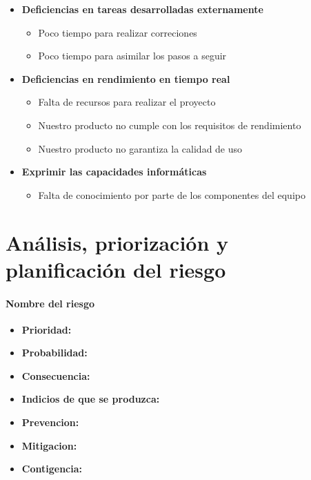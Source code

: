 \documentclass[spanish,a4paper,12pt]{report}	%
\begin{document}
\begin{itemize}
\begin{itemize}
	\end{itemize}
\item \textbf {Deficiencias en tareas desarrolladas externamente}
	\begin{itemize}
		\item {Poco tiempo para realizar correciones}
		\item {Poco tiempo para asimilar los pasos a seguir}
	\end{itemize}
\item \textbf {Deficiencias en rendimiento en tiempo real}
	\begin{itemize}
		\item {Falta de recursos para realizar el proyecto}
		\item {Nuestro producto no cumple con los requisitos de rendimiento}
		\item {Nuestro producto no garantiza la calidad de uso}
	\end{itemize}
\item \textbf {Exprimir las capacidades informáticas}
	\begin{itemize}
		\item {Falta de conocimiento por parte de los componentes del equipo}
	\end{itemize}
\end{itemize}

\newpage
\newpage

\part{Análisis, priorización y planificación del riesgo}
\subsection*{Nombre del riesgo}			%
	\begin{itemize}
		\item \textbf {Prioridad:}
		\item \textbf {Probabilidad:}
		\item \textbf {Consecuencia:}
		\item \textbf {Indicios de que se produzca:}
		\item \textbf {Prevencion:}
		\item \textbf {Mitigacion:}
		\item \textbf {Contigencia:}
	\end{itemize}



\end{document}
